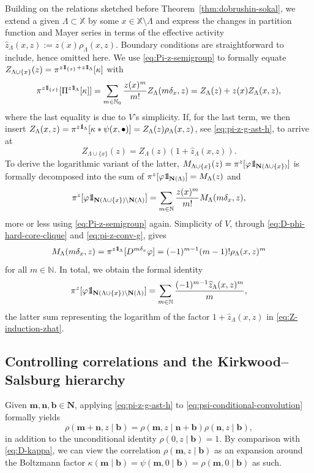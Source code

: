\documentclass[reqno, 11pt]{amsart}
\theoremstyle{definition}
\newcommand{\N}{\mathbb{N}}
\newcommand{\X}{\mathbb X}
\newcommand{\be}{\begin{equation}}
\newcommand{\ee}{\end{equation}}
\def\1{{\mathchoice {1\mskip-4mu\mathrm l}      
{1\mskip-4mu\mathrm l}
{1\mskip-4.5mu\mathrm l} {1\mskip-5mu\mathrm l}}}
\begin{document}
Building on the relations sketched before Theorem~\ref{thm:dobrushin-sokal}, we extend a given $\Lambda \subset \X$ by some $x \in \X \setminus \Lambda$ and express the changes in partition function and Mayer series in terms of the effective activity $\widehat z_\Lambda(x, z) := z(x) \rho_\Lambda(x, z)$. 
Boundary conditions are straightforward to include, hence omitted here. 
We use \eqref{eq:Pi-z-semigroup} to formally equate $Z_{\Lambda \cup \{x\}}(z) = \pi^{z \1_{\{x\}} + z \1_\Lambda}[\kappa]$ with
\[
	\pi^{z \1_{\{x\}}}[\Pi^{z \1_\Lambda}[\kappa]] = \sum_{m \in \N_0} \frac{z(x)^m}{m!} Z_\Lambda(m \delta_x, z) = Z_\Lambda(z) + z(x) Z_\Lambda(x, z),
\]
where the last equality is due to $V$'s simplicity. 
If, for the last term, we then insert $Z_\Lambda(x, z) = \pi^{z \1_\Lambda}[\kappa \ast \psi(x, \bullet)] = Z_\Lambda(z) \rho_\Lambda(x, z)$, see \eqref{eq:pi-z-g-ast-h}, to arrive at
\be \label{eq:Z-induction-zhat}
	Z_{\Lambda \cup \{x\}}(z) = Z_\Lambda(z) (1 + \widehat z_\Lambda(x, z)).
\ee
To derive the logarithmic variant of the latter, $M_{\Lambda \cup \{x\}}(z) = \pi^z[\varphi \1_{\mathbf N(\Lambda \cup \{x\})}]$ is formally decomposed into the sum of $\pi^z[\varphi \1_{\mathbf N(\Lambda)}] = M_\Lambda(z)$ and
\[
	\pi^z[\varphi \1_{\mathbf N(\Lambda \cup \{x\}) \setminus \mathbf N(\Lambda)}] = \sum_{m \in \N} \frac{z(x)^m}{m!} M_\Lambda(m \delta_x, z),
\]
more or less using \eqref{eq:Pi-z-semigroup} again. 
Simplicity of $V$, through \eqref{eq:D-phi-hard-core-clique} and \eqref{eq:pi-z-conv-g}, gives
\[
	M_\Lambda(m \delta_x, z) = \pi^{z \1_\Lambda}[D^{m \delta_x} \varphi] = (-1)^{m-1} (m-1)! \rho_\Lambda(x, z)^m
\]
for all $m \in \N$. 
In total, we obtain the formal identity
\be \label{eq:M-induction-zhat}
	\pi^z[\varphi \1_{\mathbf N(\Lambda \cup \{x\}) \setminus \mathbf N(\Lambda)}] = \sum_{m \in \N} \frac{(-1)^{m-1} \widehat z_\Lambda(x, z)^m}{m},
\ee
the latter sum representing the logarithm of the factor $1 + \widehat z_\Lambda(x, z)$ in \eqref{eq:Z-induction-zhat}.

\subsection{Controlling correlations and the Kirkwood--Salsburg hierarchy}

Given $\mathbf m, \mathbf n, \mathbf b \in \mathbf N$, applying \eqref{eq:pi-z-g-ast-h} to \eqref{eq:psi-conditional-convolution} formally yields
\be \label{eq:D-rho}
	\rho(\mathbf m + \mathbf n, z \mid \mathbf b) = \rho(\mathbf m, z \mid \mathbf n + \mathbf b) \rho(\mathbf n, z \mid \mathbf b),
\ee
in addition to the unconditional identity $\rho(0, z \mid \mathbf b) = 1$. 
By comparison with \eqref{eq:D-kappa}, we can view the correlation $\rho(\mathbf m, z \mid \mathbf b)$ as an expansion around the Boltzmann factor $\kappa(\mathbf m \mid \mathbf b) = \psi(\mathbf m, 0 \mid \mathbf b) = \rho(\mathbf m, 0 \mid \mathbf b)$ as such.
\end{document}
